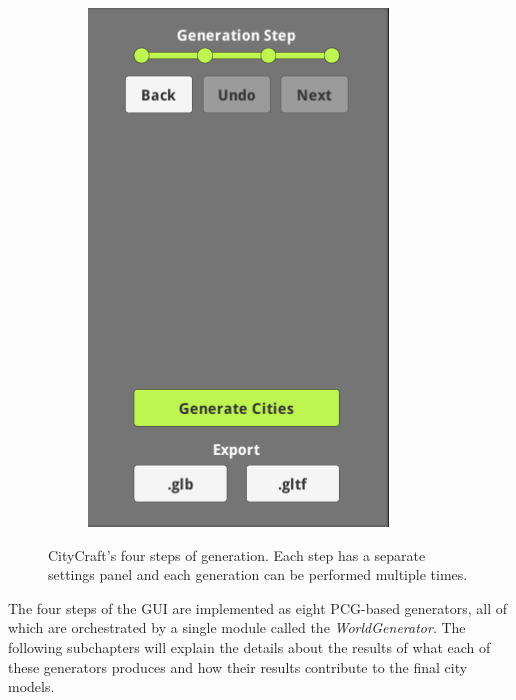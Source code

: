 \begin{figure}[H]
\begin{subfigure}[b]{0.24\textwidth}
    \includegraphics[width=\textwidth]{figure/results/gui4.png}
  \end{subfigure}

  \caption{CityCraft's four steps of generation. Each step has a separate settings panel and each generation can be performed multiple times.}
  \label{fig:guisteps}
\end{figure}

The four steps of the GUI are implemented as eight PCG-based generators, all of which are orchestrated by a single module called the \textit{WorldGenerator}.
The following subchapters will explain the details about the results of what each of these generators produces and how their results contribute to the final city models.









